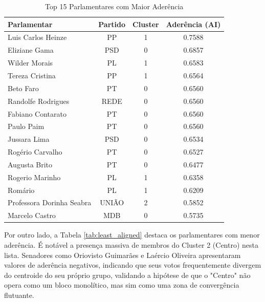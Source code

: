 \documentclass[conference]{IEEEtran}
\begin{document}
\begin{table}[H]
\caption{Top 15 Parlamentares com Maior Aderência}
\begin{center}
\begin{tabular}{|l|c|c|c|}
\hline
\textbf{Parlamentar} & \textbf{Partido} & \textbf{Cluster} & \textbf{Aderência (AI)} \\
\hline
Luis Carlos Heinze & PP & 1 & 0.7588 \\
Eliziane Gama & PSD & 0 & 0.6857 \\
Wilder Morais & PL & 1 & 0.6583 \\
Tereza Cristina & PP & 1 & 0.6564 \\
Beto Faro & PT & 0 & 0.6560 \\
Randolfe Rodrigues & REDE & 0 & 0.6560 \\
Fabiano Contarato & PT & 0 & 0.6560 \\
Paulo Paim & PT & 0 & 0.6560 \\
Jussara Lima & PSD & 0 & 0.6534 \\
Rogério Carvalho & PT & 0 & 0.6527 \\
Augusta Brito & PT & 0 & 0.6477 \\
Rogerio Marinho & PL & 1 & 0.6358 \\
Romário & PL & 1 & 0.6209 \\
Professora Dorinha Seabra & UNIÃO & 2 & 0.5852 \\
Marcelo Castro & MDB & 0 & 0.5735 \\
\hline
\end{tabular}
\label{tab:top_aligned}
\end{center}
\end{table}

Por outro lado, a Tabela \ref{tab:least_aligned} destaca os parlamentares com menor aderência. É notável a presença massiva de membros do Cluster 2 (Centro) nesta lista. Senadores como Oriovisto Guimarães e Laércio Oliveira apresentaram valores de aderência negativos, indicando que seus votos frequentemente divergem do centroide do seu próprio grupo, validando a hipótese de que o "Centro" não opera como um bloco monolítico, mas sim como uma zona de convergência flutuante.
\end{document}
